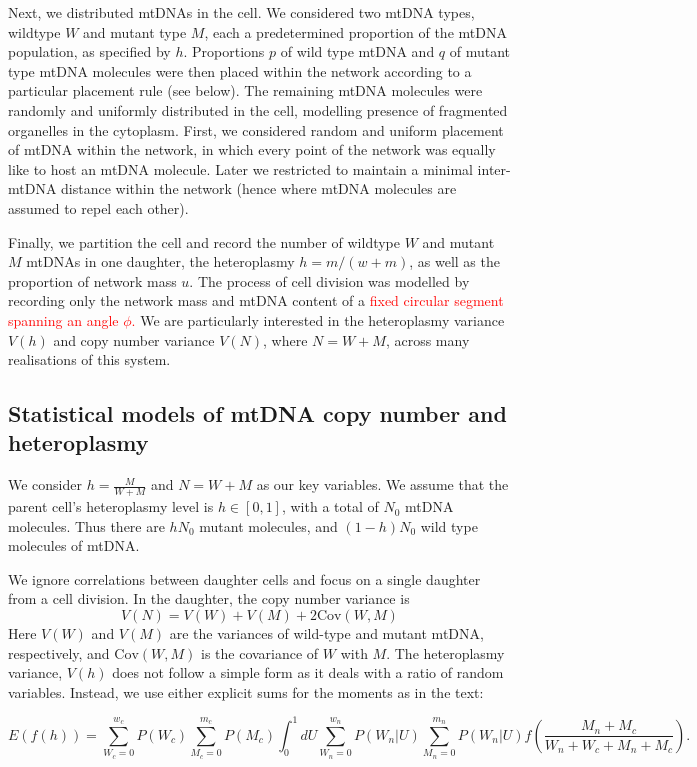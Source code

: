 \documentclass{article}
\begin{document}
Next, we distributed mtDNAs in the cell. We considered two mtDNA types, wildtype $W$ and mutant type $M$, each a predetermined proportion of the mtDNA population, as specified by $h$. Proportions $p$ of wild type mtDNA and $q$ of mutant type mtDNA molecules were then placed within the network according to a particular placement rule (see below). The remaining mtDNA molecules were randomly and uniformly distributed in the cell, modelling presence of fragmented organelles in the cytoplasm. First, we considered random and uniform placement of mtDNA within the network, in which every point of the network was equally like to host an mtDNA molecule. Later we restricted to maintain a minimal inter-mtDNA distance within the network (hence where mtDNA molecules are assumed to repel each other).

Finally, we partition the cell and record the number of wildtype $W$ and mutant $M$ mtDNAs in one daughter, the heteroplasmy $h = m/(w+m)$, as well as the proportion of network mass $u$. The process of cell division was modelled by recording only the network mass and mtDNA content of a \textcolor{red}{fixed circular segment spanning an angle $\phi$.}  We are particularly interested in the heteroplasmy variance $V(h)$ and copy number variance $V(N)$, where $N=W+M$, across many realisations of this system.  

\subsection*{Statistical models of mtDNA copy number and heteroplasmy}
We consider $h = \frac{M}{W+M}$ and $N=W+M$ as our key variables. We assume that the parent cell's heteroplasmy level is $h\in [0,1]$, with a total of $N_0$ mtDNA molecules. Thus there are $hN_0$ mutant molecules, and $(1-h)N_0$ wild type molecules of mtDNA. 

We ignore correlations between daughter cells and focus on a single daughter from a cell division. In the daughter, the copy number variance is
\begin{equation}
    V(N) = V(W)+V(M)+2\mathrm{Cov}(W,M)
\end{equation}
Here $V(W)$ and $V(M)$ are the variances of wild-type and mutant mtDNA, respectively, and $\mathrm{Cov}(W,M)$ is the covariance of $W$ with $M$. The heteroplasmy variance, $V(h)$ does not follow a simple form as it deals with a ratio of random variables. Instead, we use either explicit sums for the moments as in the text:

\begin{equation}
    E(f(h)) = \sum_{W_c = 0}^{w_c} P(W_c) \sum_{M_c = 0}^{m_c} P(M_c) \int_0^1 dU \sum_{W_n = 0}^{w_n} P(W_n|U) \sum_{M_n = 0}^{m_n} P(W_n|U) f\left(\frac{M_n+M_c}{W_n+W_c+M_n+M_c}\right).
\end{equation}
\end{document}
